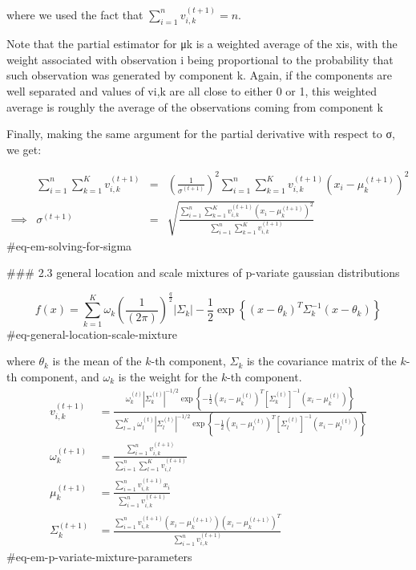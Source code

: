 where we used the fact that $\sum_{i=1}^n v_{i,k}^{(t+1)} = n$.

Note that the partial estimator for μk is a weighted average of the xis, with the weight associated with observation i being proportional to the probability that such observation was generated by component k. Again, if the components are well separated and values of vi,k are all close to either 0 or 1, this weighted average is roughly the average of the observations coming from component k

Finally, making the same argument for the partial derivative with respect to σ, we get:

$$
\begin{aligned}
& 
    \sum_{i=1}^n \sum_{k=1}^K v_{i,k}^{(t+1)} &=& \left ( \frac {1}{\sigma^{(t+1)}} \right ) ^ 2  \sum_{i=1}^n \sum_{k=1}^K v_{i,k}^{(t+1)} (x_i - \mu_k^{(t+1)})^2
\\ \implies &
 \sigma^{(t+1)} &=& \sqrt{\frac{\sum_{i=1}^n \sum_{k=1}^K v_{i,k}^{(t+1)} (x_i - \mu_k^{(t+1)})^2}{\sum_{i=1}^n \sum_{k=1}^K v_{i,k}^{(t+1)}}}
\end{aligned}
$$ {#eq-em-solving-for-sigma}

### 2.3 general location and scale mixtures of p-variate gaussian distributions

$$
f(x) =
\sum_{k=1}^K
\omega_k
\left( \frac{1}{(2\pi)} \right) ^\frac{q}{2}
|\Sigma_k|-\frac{1}{2} \exp
\left\{
(x - \theta_k)^T \Sigma_k^{-1}(x - \theta_k)
\right\}
$$ {#eq-general-location-scale-mixture}

where $\theta_k$ is the mean of the $k$-th component, $\Sigma_k$ is the covariance matrix of the $k$-th component, and $\omega_k$ is the weight for the $k$-th component.
$$
\begin{aligned}
v_{i,k}^{(t+1)} &= \frac{\omega_k^{(t)} |\Sigma_k^{(t)}|^{-1/2} \exp\left\{-\frac{1}{2}(x_i - \mu_k^{(t)})^T [\Sigma_k^{(t)}]^{-1}(x_i - \mu_k^{(t)})\right\}}{\sum_{l=1}^K \omega_l^{(t)} |\Sigma_l^{(t)}|^{-1/2} \exp\left\{-\frac{1}{2}(x_i - \mu_l^{(t)})^T [\Sigma_l^{(t)}]^{-1}(x_i - \mu_l^{(t)})\right\}} \\
\omega_k^{(t+1)} &= \frac{\sum_{i=1}^n v_{i,k}^{(t+1)}}{\sum_{i=1}^n \sum_{l=1}^K v_{i,l}^{(t+1)}} \\
\mu_k^{(t+1)} &= \frac{\sum_{i=1}^n v_{i,k}^{(t+1)} x_i}{\sum_{i=1}^n v_{i,k}^{(t+1)}} \\
\Sigma_k^{(t+1)} &= \frac{\sum_{i=1}^n v_{i,k}^{(t+1)} (x_i - \mu_k^{(t+1)}) (x_i - \mu_k^{(t+1)})^T}{\sum_{i=1}^n v_{i,k}^{(t+1)}}
\end{aligned}
$$ {#eq-em-p-variate-mixture-parameters}

